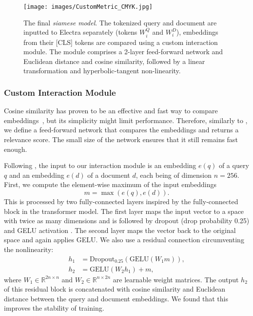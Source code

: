 \documentclass[letterpaper]{article} \usepackage{aaai22 }  \usepackage{times}  \usepackage{helvet}  \usepackage{courier}  \usepackage[hyphens]{url}  \usepackage{graphicx} \usepackage{amsmath,amsfonts,amssymb, mathabx,bm,bbm}
\begin{document}
\begin{figure}[!htb]
    \centering
    \texttt{[image: images/CustomMetric\_CMYK.jpg]}
    \caption{The final \textit{siamese model}. The tokenized query and document are inputted to Electra separately (tokens $W^Q_i$ and $W^D_i$), embeddings from their [CLS] tokens are compared using a custom interaction module. The module comprises a 2-layer feed-forward network and Euclidean distance and cosine similarity, followed by a linear transformation and hyperbolic-tangent non-linearity.}
    \label{fig:my_label}
\end{figure}

\subsubsection{Custom Interaction Module}
\label{ssec:custom_metric}

Cosine similarity has proven to be an effective and fast way to compare embeddings~\cite{sentence_bert}, but its simplicity might limit performance. Therefore, similarly to \citet{karpukhin2020dense}, we define a feed-forward network that compares the embeddings and returns a relevance score. The small size of the network ensures that it still remains fast enough.

Following \citet{twinbert}, the input to our interaction module is an embedding $e(q)$ of a query $q$ and an embedding $e(d)$ of a document $d$, each being of dimension $n = 256$. First, we compute the element-wise maximum of the input embeddings 
$$m = \max(e(q), e(d)).$$
This is processed by two fully-connected layers inspired by the fully-connected block in the transformer model. The first layer maps the input vector to a space with twice as many dimensions and is followed by dropout (drop probability 0.25) and GELU activation \cite{gelu2016}. The second layer maps the vector back to the original space and again applies GELU. We also use a residual connection circumventing the nonlinearity:
\begin{align*}
h_1 &= \mathrm{Dropout_{0.25}}(\mathrm{GELU}(W_1 m)),\\
h_2 &= \mathrm{GELU}(W_2 h_1) + m,
\end{align*}
where $W_1 \in \mathbb{R}^{2n \times n}$ and $W_2 \in \mathbb{R}^{n \times 2n}$ are learnable weight matrices.
The output $h_2$ of this residual block is concatenated with cosine similarity and Euclidean distance between the query and document embeddings. We found that this improves the stability of training.
\end{document}
